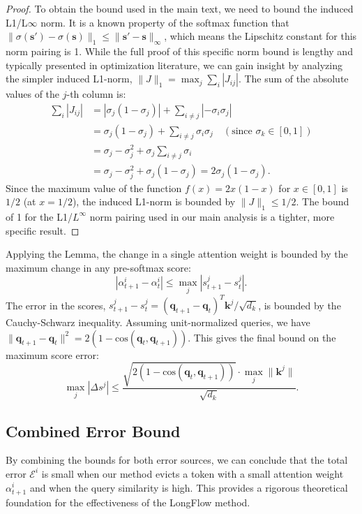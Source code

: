 \begin{proof}
To obtain the bound used in the main text, we need to bound the induced L1/L\(\infty\) norm. It is a known property of the softmax function that \( \|\sigma(\mathbf{s}') - \sigma(\mathbf{s})\|_1 \le \|\mathbf{s}' - \mathbf{s}\|_\infty \), which means the Lipschitz constant for this norm pairing is 1. While the full proof of this specific norm bound is lengthy and typically presented in optimization literature, we can gain insight by analyzing the simpler induced L1-norm, \( \|J\|_1 = \max_j \sum_i |J_{ij}| \). The sum of the absolute values of the \(j\)-th column is:
\begin{align*}
    \sum_i |J_{ij}| &= |\sigma_j(1-\sigma_j)| + \sum_{i \neq j} |-\sigma_i \sigma_j| \\
    &= \sigma_j(1-\sigma_j) + \sum_{i \neq j} \sigma_i \sigma_j \quad (\text{since } \sigma_k \in [0,1]) \\
    &= \sigma_j - \sigma_j^2 + \sigma_j \sum_{i \neq j} \sigma_i \\
    &= \sigma_j - \sigma_j^2 + \sigma_j (1 - \sigma_j) = 2\sigma_j(1-\sigma_j).
\end{align*}
Since the maximum value of the function \( f(x) = 2x(1-x) \) for \( x \in [0,1] \) is \( 1/2 \) (at \(x=1/2\)), the induced L1-norm is bounded by \( \|J\|_1 \le 1/2 \). The bound of 1 for the L1/\(L^\infty\) norm pairing used in our main analysis is a tighter, more specific result.
\end{proof}

Applying the Lemma, the change in a single attention weight is bounded by the maximum change in any pre-softmax score:
\begin{equation}
    |\alpha_{t+1}^i - \alpha_t^i| \le \max_j |s_{t+1}^j - s_t^j|.
\end{equation}
The error in the scores, \(s_{t+1}^j - s_t^j = (\mathbf{q}_{t+1} - \mathbf{q}_t)^T \mathbf{k}^j / \sqrt{d_k} \), is bounded by the Cauchy-Schwarz inequality. Assuming unit-normalized queries, we have \( \|\mathbf{q}_{t+1} - \mathbf{q}_t\|^2 = 2(1 - \text{cos}(\mathbf{q}_t, \mathbf{q}_{t+1})) \). This gives the final bound on the maximum score error:
\begin{equation}
    \max_j |\Delta s^j| \le \frac{\sqrt{2(1 - \text{cos}(\mathbf{q}_t, \mathbf{q}_{t+1}))} \cdot \max_j\|\mathbf{k}^j\|}{\sqrt{d_k}}.
\end{equation}

\subsection{Combined Error Bound}
By combining the bounds for both error sources, we can conclude that the total error \( \mathcal{E}^i \) is small when our method evicts a token with a small attention weight \( \alpha_{t+1}^i \) and when the query similarity is high. This provides a rigorous theoretical foundation for the effectiveness of the LongFlow method.

